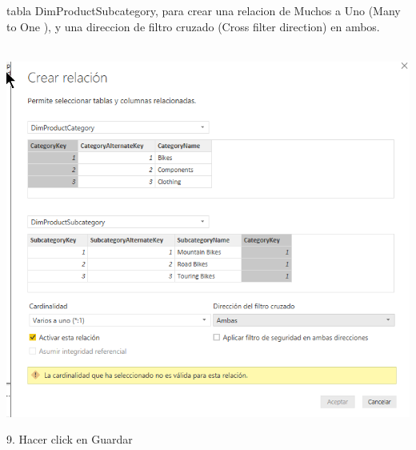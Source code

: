 \documentclass[12pt,letterpaper]{article}
\begin{document}
tabla DimProductSubcategory, para crear una relacion de Muchos a Uno (Many to One ), y una direccion de filtro cruzado (Cross filter direction) en ambos.\\\\
\begin{center}
\includegraphics[width=15cm]{IMG/9.png} 
\end{center}
9. Hacer click en Guardar\\\\
\end{document}
